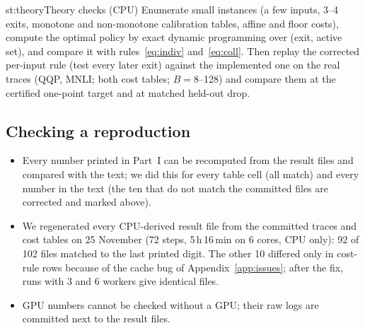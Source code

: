 \begin{step}{st:theory}{Theory checks (CPU)}
Enumerate small instances (a few inputs, 3--4 exits, monotone and non-monotone calibration tables, affine and floor
costs), compute the optimal policy by exact dynamic programming over (exit, active set), and compare it with
rules~\eqref{eq:indiv} and~\eqref{eq:coll}. Then replay the corrected per-input rule (test every later exit) against
the implemented one on the real traces (QQP, MNLI; both cost tables; $B=8$--128) and compare them at the certified
one-point target and at matched held-out drop.
\end{step}

\subsection{Checking a reproduction}
\begin{itemize}
  \item Every number printed in Part~I can be recomputed from the result files and compared with the text; we did
  this for every table cell (all match) and every number in the text (the ten that do not match the committed files are corrected and marked
  above).
  \item We regenerated every CPU-derived result file from the committed traces and cost tables on 25 November (72
  steps, 5\,h\,16\,min on 6 cores, CPU only): 92 of 102 files matched to the last printed digit. The other 10 differed
  only in cost-rule rows because of the cache bug of Appendix~\ref{app:issues}; after the fix, runs with 3 and 6
  workers give identical files.
  \item GPU numbers cannot be checked without a GPU; their raw logs are committed next to the result files.
\end{itemize}
